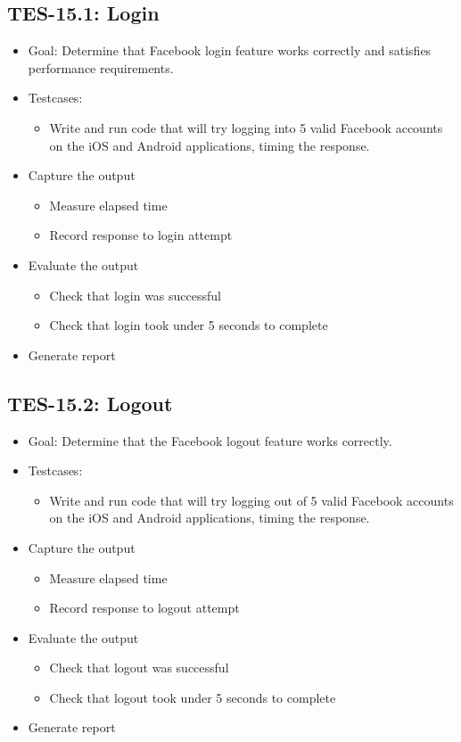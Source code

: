 \subsection{TES-15.1: Login}
\begin{itemize}
\item Goal: Determine that Facebook login feature works correctly and 
satisfies performance requirements.
\item Testcases: 
\begin{itemize}
\item Write and run code that will try logging into 5 valid Facebook accounts 
on the iOS and Android applications, timing the response.
\end{itemize}
\item Capture the output 
\begin{itemize}
\item Measure elapsed time 
\item Record response to login attempt
\end{itemize}
\item Evaluate the output
\begin{itemize}
\item Check that login was successful
\item Check that login took under 5 seconds to complete
\end{itemize}
\item Generate report 
\end{itemize}

\subsection{TES-15.2: Logout}
\label{subsec:logout}
\begin{itemize}
\item Goal: Determine that the Facebook logout feature works correctly.
\item Testcases: 
\begin{itemize}
\item Write and run code that will try logging out of 5 valid Facebook accounts 
on the iOS and Android applications, timing the response.
\end{itemize}
\item Capture the output 
\begin{itemize}
\item Measure elapsed time 
\item Record response to logout attempt
\end{itemize}
\item Evaluate the output 
\begin{itemize}
\item Check that logout was successful
\item Check that logout took under 5 seconds to complete
\end{itemize}
\item Generate report 
\end{itemize}

